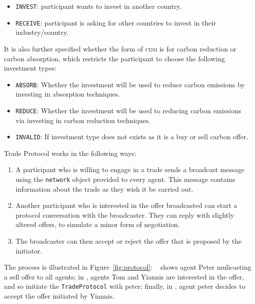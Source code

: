 \begin{itemize}
	\item \texttt{INVEST}: participant wants to invest in another country.
	\item \texttt{RECEIVE}: participant is asking for other countries to invest in their industry/country.
\end{itemize}

It is also further specified whether the form of \textsc{cdm} is for carbon reduction or carbon absorption, which restricts the participant to choose the following investment types:

\begin{itemize}
	\item \texttt{ABSORB}: Whether the investment will be used to reduce carbon emissions by investing in absorption techniques.
	\item \texttt{REDUCE}: Whether the investment will be used to reducing carbon emissions via investing in carbon reduction techniques.
	\item \texttt{INVALID}: If investment type does not exists as it is a buy or sell carbon offer.
\end{itemize}

Trade Protocol works in the following ways:

\begin{enumerate}
	\item A participant who is willing to engage in a trade sends a broadcast message using the \texttt{network} object provided to every agent. This message contains information about the trade as they wish it be carried out.
	\item Another participant who is interested in the offer broadcasted can start a protocol conversation with the broadcaster. They can reply with slightly altered offers, to simulate a minor form of negotiation.
	\item The broadcaster can then accept or reject the offer that is proposed by the initiator.
\end{enumerate}

%
%

The process is illustrated in Figure~\ref{fig:protocol}: ~ shows agent Peter mulicasting a sell offer to all agents; in , agents Tom and Yiannis are interested in the offer, and so initiate the \texttt{TradeProtocol} with peter; finally, in , agent peter decides to accept the offer initiated by Yiannis.

